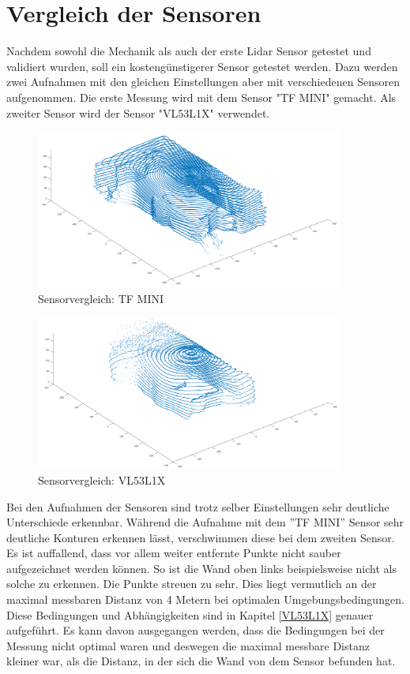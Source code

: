 \section{Vergleich der Sensoren}

Nachdem sowohl die Mechanik als auch der erste Lidar Sensor getestet und validiert wurden, soll ein kostengünstigerer Sensor getestet werden. Dazu werden zwei Aufnahmen mit den gleichen Einstellungen aber mit verschiedenen Sensoren aufgenommen. Die erste Messung wird mit dem Sensor "TF MINI" gemacht. Als zweiter Sensor wird der Sensor "VL53L1X" verwendet.

 

\begin{figure}[H]
	\centering
	\includegraphics[width=0.9\textwidth]{images/Validierung/Aufloesungen/mittel.png}
	\caption{Sensorvergleich: TF MINI}
	\label{hoch}
\end{figure}



\begin{figure}[H]
	\centering
	\includegraphics[width=0.9\textwidth]{images/Validierung/VL53.png}
	\caption{Sensorvergleich: VL53L1X}
	\label{vlx}
\end{figure}

Bei den Aufnahmen der Sensoren sind trotz selber Einstellungen sehr deutliche Unterschiede erkennbar. Während die Aufnahme mit dem ''TF MINI'' Sensor sehr deutliche Konturen erkennen lässt, verschwimmen diese bei dem zweiten Sensor. Es ist auffallend, dass vor allem weiter entfernte Punkte nicht sauber aufgezeichnet werden können. So ist die Wand oben links beispielsweise nicht als solche zu erkennen. Die Punkte streuen zu sehr. Dies liegt vermutlich an der maximal messbaren Distanz von 4 Metern bei optimalen Umgebungsbedingungen. Diese Bedingungen und Abhängigkeiten sind in Kapitel \ref{VL53L1X} genauer aufgeführt. Es kann davon ausgegangen werden, dass die Bedingungen bei der Messung nicht optimal waren und deswegen die maximal messbare Distanz kleiner war, als die Distanz, in der sich die Wand von dem Sensor befunden hat. 

